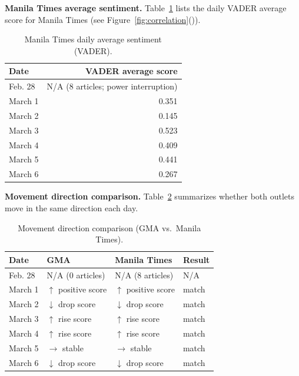 \documentclass[sigconf, nonacm]{acmart}
\begin{document}
\textbf{Manila Times average sentiment.} Table~\ref{tab:manilatimes-avg} lists the daily VADER average score for Manila Times (see Figure~\ref{fig:correlation}()).
\begin{table}[h]
  \caption{Manila Times daily average sentiment (VADER).}
  \label{tab:manilatimes-avg}
  \centering
  \small
  \begin{tabular}{lr}
    \toprule
    Date & VADER average score \\
    \midrule
    Feb. 28 & N/A (8 articles; power interruption) \\
    March 1 & 0.351 \\
    March 2 & 0.145 \\
    March 3 & 0.523 \\
    March 4 & 0.409 \\
    March 5 & 0.441 \\
    March 6 & 0.267 \\
    \bottomrule
  \end{tabular}
\end{table}

\textbf{Movement direction comparison.} Table~\ref{tab:gma-mt-movement} summarizes whether both outlets move in the same direction each day.
\begin{table}[h]
  \caption{Movement direction comparison (GMA vs.\ Manila Times).}
  \label{tab:gma-mt-movement}
  \centering
  \small
  \begin{tabular}{p{}p{}p{}p{}}
    \toprule
    Date & GMA & Manila Times & Result \\
    \midrule
    Feb. 28 & N/A (0 articles) & N/A (8 articles) & N/A \\
    March 1 & $\uparrow$ positive score & $\uparrow$ positive score & match \\
    March 2 & $\downarrow$ drop score & $\downarrow$ drop score & match \\
    March 3 & $\uparrow$ rise score & $\uparrow$ rise score & match \\
    March 4 & $\uparrow$ rise score & $\uparrow$ rise score & match \\
    March 5 & $\rightarrow$ stable & $\rightarrow$ stable & match \\
    March 6 & $\downarrow$ drop score & $\downarrow$ drop score & match \\
    \bottomrule
  \end{tabular}
\end{table}
\end{document}
